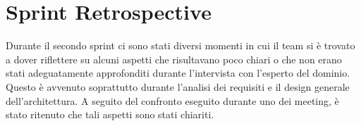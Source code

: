 \section{Sprint Retrospective}
Durante il secondo sprint ci sono stati diversi momenti in cui il team si è trovato a dover riflettere su alcuni aspetti che risultavano poco chiari o che non erano stati adeguatamente approfonditi durante l'intervista con l'esperto del dominio. Questo è avvenuto soprattutto durante l'analisi dei requisiti e il design generale dell'architettura. A seguito del confronto eseguito durante uno dei meeting, è stato ritenuto che tali aspetti sono stati chiariti.